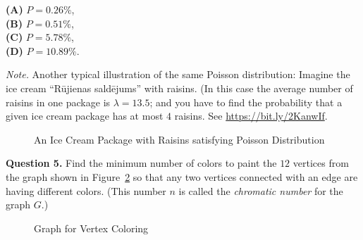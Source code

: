 \documentclass[jou]{apa6}
\begin{document}
{\bf (A)} $P = 0.26\%$,\\
{\bf (B)} $P = 0.51\%$,\\
{\bf (C)} $P = 5.78\%$,\\
{\bf (D)} $P = 10.89\%$.

{\em Note.} Another typical illustration of the same Poisson distribution: 
Imagine the ice cream ``R\={u}jienas sald\={e}jums'' with raisins. (In this case
the average number of raisins in one package is $\lambda = 13.5$; and you have to find the 
probability that a given ice cream package has at most $4$ raisins. 
See \url{https://bit.ly/2KanwIf}. 

\begin{figure}[!htb]
\caption{\label{fig:rujiena-icecream} An Ice Cream Package with Raisins satisfying Poisson Distribution}
\end{figure}



\vspace{10pt}
{\bf Question 5.} Find the minimum number of colors to paint the $12$ vertices
from the graph shown in Figure~\ref{fig:graph-coloring} so
that any two vertices connected with an edge are having different colors. 
(This number $n$ is called the {\em chromatic number} for the graph $G$.)

\begin{figure}[!htb]
\caption{\label{fig:graph-coloring} Graph for Vertex Coloring}
\end{figure}
\end{document}
